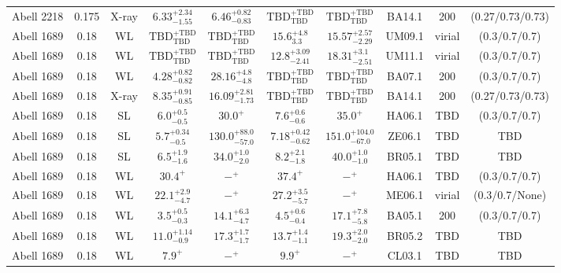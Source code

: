 \begin{table}
\begin{tabular}{cccccccccc}
Abell 2218 & 0.175 & X-ray & ${6.33}^{+2.34}_{-1.55}$ & ${6.46}^{+0.82}_{-0.83}$ & ${\mathrm{TBD}}^{+\mathrm{TBD}}_{\mathrm{TBD}}$ & ${\mathrm{TBD}}^{+\mathrm{TBD}}_{\mathrm{TBD}}$ & BA14.1 & 200 & (0.27/0.73/0.73) \\
Abell 1689 & 0.18 & WL & ${\mathrm{TBD}}^{+\mathrm{TBD}}_{\mathrm{TBD}}$ & ${\mathrm{TBD}}^{+\mathrm{TBD}}_{\mathrm{TBD}}$ & ${15.6}^{+4.8}_{3.3}$ & ${15.57}^{+2.57}_{-2.29}$ & UM09.1 & virial & (0.3/0.7/0.7) \\
Abell 1689 & 0.18 & WL & ${\mathrm{TBD}}^{+\mathrm{TBD}}_{\mathrm{TBD}}$ & ${\mathrm{TBD}}^{+\mathrm{TBD}}_{\mathrm{TBD}}$ & ${12.8}^{+3.09}_{-2.41}$ & ${18.31}^{+3.1}_{-2.51}$ & UM11.1 & virial & (0.3/0.7/0.7) \\
Abell 1689 & 0.18 & WL & ${4.28}^{+0.82}_{-0.82}$ & ${28.16}^{+4.8}_{-4.8}$ & ${\mathrm{TBD}}^{+\mathrm{TBD}}_{\mathrm{TBD}}$ & ${\mathrm{TBD}}^{+\mathrm{TBD}}_{\mathrm{TBD}}$ & BA07.1 & 200 & (0.3/0.7/0.7) \\
Abell 1689 & 0.18 & X-ray & ${8.35}^{+0.91}_{-0.85}$ & ${16.09}^{+2.81}_{-1.73}$ & ${\mathrm{TBD}}^{+\mathrm{TBD}}_{\mathrm{TBD}}$ & ${\mathrm{TBD}}^{+\mathrm{TBD}}_{\mathrm{TBD}}$ & BA14.1 & 200 & (0.27/0.73/0.73) \\
Abell 1689 & 0.18 & SL & ${6.0}^{+0.5}_{-0.5}$ & ${30.0}^{+}_{}$ & ${7.6}^{+0.6}_{-0.6}$ & ${35.0}^{+}_{}$ & HA06.1 & TBD & (0.3/0.7/0.7) \\
Abell 1689 & 0.18 & SL & ${5.7}^{+0.34}_{-0.5}$ & ${130.0}^{+88.0}_{-57.0}$ & ${7.18}^{+0.42}_{-0.62}$ & ${151.0}^{+104.0}_{-67.0}$ & ZE06.1 & TBD & TBD \\
Abell 1689 & 0.18 & SL & ${6.5}^{+1.9}_{-1.6}$ & ${34.0}^{+1.0}_{-2.0}$ & ${8.2}^{+2.1}_{-1.8}$ & ${40.0}^{+1.0}_{-1.0}$ & BR05.1 & TBD & TBD \\
Abell 1689 & 0.18 & WL & ${30.4}^{+}_{}$ & ${-}^{+}_{}$ & ${37.4}^{+}_{}$ & ${-}^{+}_{}$ & HA06.1 & TBD & (0.3/0.7/0.7) \\
Abell 1689 & 0.18 & WL & ${22.1}^{+2.9}_{-4.7}$ & ${-}^{+}_{}$ & ${27.2}^{+3.5}_{-5.7}$ & ${-}^{+}_{}$ & ME06.1 & virial & (0.3/0.7/None) \\
Abell 1689 & 0.18 & WL & ${3.5}^{+0.5}_{-0.3}$ & ${14.1}^{+6.3}_{-4.7}$ & ${4.5}^{+0.6}_{-0.4}$ & ${17.1}^{+7.8}_{-5.8}$ & BA05.1 & 200 & (0.3/0.7/0.7) \\
Abell 1689 & 0.18 & WL & ${11.0}^{+1.14}_{-0.9}$ & ${17.3}^{+1.7}_{-1.7}$ & ${13.7}^{+1.4}_{-1.1}$ & ${19.3}^{+2.0}_{-2.0}$ & BR05.2 & TBD & TBD \\
Abell 1689 & 0.18 & WL & ${7.9}^{+}_{}$ & ${-}^{+}_{}$ & ${9.9}^{+}_{}$ & ${-}^{+}_{}$ & CL03.1 & TBD & TBD \\

\end{tabular}
\end{table}
